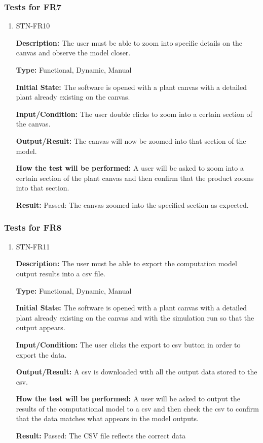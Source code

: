 \documentclass[12pt, titlepage]{article}
\begin{document}
\subsubsection{Tests for FR7}
\begin{enumerate}
\item{STN-FR10\\}

\textbf{Description:} The user must be able to zoom into specific details on the canvas and observe the model closer.

\textbf{Type:} Functional, Dynamic, Manual

\textbf{Initial State:} The software is opened with a plant canvas with a detailed plant already existing on the canvas.

\textbf{Input/Condition:} The user double clicks to zoom into a certain section of the canvas.

\textbf{Output/Result:} The canvas will now be zoomed into that section of the model.

\textbf{How the test will be performed:} A user will be asked to zoom into a certain section of the plant canvas and then confirm that the product zooms into that section.

\textbf{Result:} Passed: The canvas zoomed into the specified section as expected.

\end{enumerate}

\subsubsection{Tests for FR8}
\begin{enumerate}

\item{STN-FR11\\}

\textbf{Description:} The user must be able to export the computation model output results into a csv file.

\textbf{Type:} Functional, Dynamic, Manual

\textbf{Initial State:} The software is opened with a plant canvas with a detailed plant already existing on the canvas and with the simulation run so that the output appears.

\textbf{Input/Condition:} The user clicks the export to csv button in order to export the data.

\textbf{Output/Result:} A csv is downloaded with all the output data stored to the csv.

\textbf{How the test will be performed:} A user will be asked to output the results of the computational model to a csv and then check the csv to confirm that the data matches what appears in the model outputs.

\textbf{Result:} Passed: The CSV file reflects the correct data

\end{enumerate}
\end{document}
